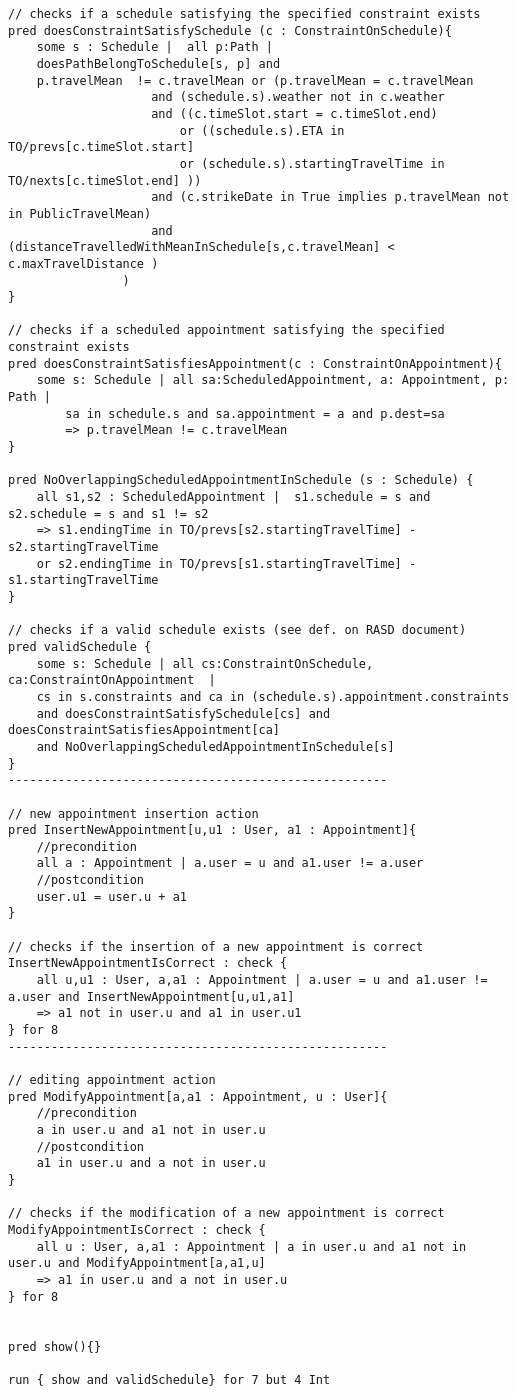 \begin{lstlisting}
// checks if a schedule satisfying the specified constraint exists
pred doesConstraintSatisfySchedule (c : ConstraintOnSchedule){
	some s : Schedule |  all p:Path |
	doesPathBelongToSchedule[s, p] and
	p.travelMean  != c.travelMean or (p.travelMean = c.travelMean 
					and (schedule.s).weather not in c.weather 
					and ((c.timeSlot.start = c.timeSlot.end) 
						or ((schedule.s).ETA in TO/prevs[c.timeSlot.start]
						or (schedule.s).startingTravelTime in TO/nexts[c.timeSlot.end] ))
					and (c.strikeDate in True implies p.travelMean not in PublicTravelMean)
					and (distanceTravelledWithMeanInSchedule[s,c.travelMean] < c.maxTravelDistance )
				)
}

// checks if a scheduled appointment satisfying the specified constraint exists
pred doesConstraintSatisfiesAppointment(c : ConstraintOnAppointment){
	some s: Schedule | all sa:ScheduledAppointment, a: Appointment, p: Path |
		sa in schedule.s and sa.appointment = a and p.dest=sa
		=> p.travelMean != c.travelMean
}

pred NoOverlappingScheduledAppointmentInSchedule (s : Schedule) {
	all s1,s2 : ScheduledAppointment |  s1.schedule = s and  s2.schedule = s and s1 != s2 
	=> s1.endingTime in TO/prevs[s2.startingTravelTime] - s2.startingTravelTime
	or s2.endingTime in TO/prevs[s1.startingTravelTime] - s1.startingTravelTime
}

// checks if a valid schedule exists (see def. on RASD document)
pred validSchedule {
	some s: Schedule | all cs:ConstraintOnSchedule, ca:ConstraintOnAppointment  | 
	cs in s.constraints and ca in (schedule.s).appointment.constraints
	and doesConstraintSatisfySchedule[cs] and doesConstraintSatisfiesAppointment[ca]
	and NoOverlappingScheduledAppointmentInSchedule[s]
}
-----------------------------------------------------

// new appointment insertion action
pred InsertNewAppointment[u,u1 : User, a1 : Appointment]{
	//precondition
	all a : Appointment | a.user = u and a1.user != a.user
	//postcondition
	user.u1 = user.u + a1
}

// checks if the insertion of a new appointment is correct
InsertNewAppointmentIsCorrect : check {
	all u,u1 : User, a,a1 : Appointment | a.user = u and a1.user != a.user and InsertNewAppointment[u,u1,a1] 
	=> a1 not in user.u and a1 in user.u1
} for 8
-----------------------------------------------------

// editing appointment action
pred ModifyAppointment[a,a1 : Appointment, u : User]{
	//precondition
	a in user.u and a1 not in user.u
	//postcondition
	a1 in user.u and a not in user.u
}

// checks if the modification of a new appointment is correct
ModifyAppointmentIsCorrect : check {
	all u : User, a,a1 : Appointment | a in user.u and a1 not in user.u and ModifyAppointment[a,a1,u]
	=> a1 in user.u and a not in user.u
} for 8


pred show(){}

run { show and validSchedule} for 7 but 4 Int

\end{lstlisting}